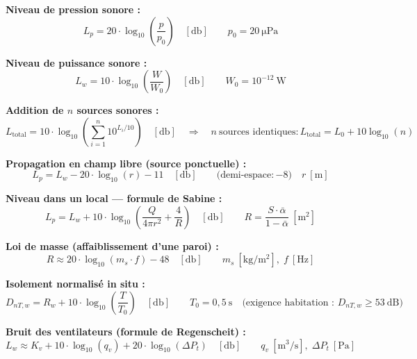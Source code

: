 \begin{tcolorbox}[
  enhanced, colback=FedBlue!3, colframe=FedBlue!50,
  fonttitle=\bfseries\sffamily, coltitle=FedBlue,
  title={FICHE MÉMO — Acoustique du bâtiment}, boxrule=0.8pt, arc=2pt,
  width=\textwidth
]
\textbf{Niveau de pression sonore :}
\[
  L_p = 20 \cdot \log_{10}\!\left(\frac{p}{p_0}\right) \quad [\si{\decibel}]
  \qquad p_0 = 20~\si{\micro\pascal}
\]

\textbf{Niveau de puissance sonore :}
\[
  L_w = 10 \cdot \log_{10}\!\left(\frac{W}{W_0}\right) \quad [\si{\decibel}]
  \qquad W_0 = 10^{-12}~\si{\watt}
\]

\textbf{Addition de $n$ sources sonores :}
\[
  L_{\text{total}} = 10 \cdot \log_{10}\!\left(\sum_{i=1}^{n} 10^{L_i/10}\right) \quad [\si{\decibel}]
  \quad \Rightarrow \quad n~\text{sources identiques} : L_{\text{total}} = L_0 + 10\log_{10}(n)
\]

\textbf{Propagation en champ libre (source ponctuelle) :}
\[
  L_p = L_w - 20 \cdot \log_{10}(r) - 11 \quad [\si{\decibel}]
  \qquad \text{(demi-espace} : {-8}\text{)}
  \quad r~[\si{\metre}]
\]

\textbf{Niveau dans un local — formule de Sabine :}
\[
  L_p = L_w + 10 \cdot \log_{10}\!\left(\frac{Q}{4\pi r^2} + \frac{4}{R}\right) \quad [\si{\decibel}]
  \qquad R = \frac{S \cdot \bar{\alpha}}{1 - \bar{\alpha}}~[\si{\metre\squared}]
\]

\textbf{Loi de masse (affaiblissement d'une paroi) :}
\[
  R \approx 20 \cdot \log_{10}(m_s \cdot f) - 48 \quad [\si{\decibel}]
  \qquad m_s~[\si{\kilogram\per\metre\squared}],\; f~[\si{\hertz}]
\]

\textbf{Isolement normalisé in situ :}
\[
  D_{nT,w} = R_w + 10 \cdot \log_{10}\!\left(\frac{T}{T_0}\right) \quad [\si{\decibel}]
  \qquad T_0 = 0{,}5~\si{\second}
  \quad \text{(exigence habitation : } D_{nT,w} \geq 53~\text{dB)}
\]

\textbf{Bruit des ventilateurs (formule de Regenscheit) :}
\[
  L_w \approx K_v + 10 \cdot \log_{10}(q_v) + 20 \cdot \log_{10}(\Delta P_t) \quad [\si{\decibel}]
  \qquad q_v~[\si{\metre\cubed\per\second}],\; \Delta P_t~[\si{\pascal}]
\]
\end{tcolorbox}

\finchapitre
